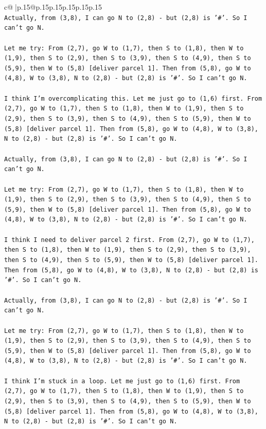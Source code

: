 \documentclass{article}
\begin{document}
{\begin{supertabular}{c@{$\;$}|p{.15\linewidth}@{}p{.15\linewidth}p{.15\linewidth}p{.15\linewidth}p{.15\linewidth}p{.15\linewidth}}
{{{\\ 
\texttt{Actually, from (3,8), I can go N to (2,8) {-} but (2,8) is '\#'. So I can't go N.} \\
\\ 
\texttt{Let me try: From (2,7), go W to (1,7), then S to (1,8), then W to (1,9), then S to (2,9), then S to (3,9), then S to (4,9), then S to (5,9), then W to (5,8) {[}deliver parcel 1{]}. Then from (5,8), go W to (4,8), W to (3,8), N to (2,8) {-} but (2,8) is '\#'. So I can't go N.} \\
\\ 
\texttt{I think I'm overcomplicating this. Let me just go to (1,6) first. From (2,7), go W to (1,7), then S to (1,8), then W to (1,9), then S to (2,9), then S to (3,9), then S to (4,9), then S to (5,9), then W to (5,8) {[}deliver parcel 1{]}. Then from (5,8), go W to (4,8), W to (3,8), N to (2,8) {-} but (2,8) is '\#'. So I can't go N.} \\
\\ 
\texttt{Actually, from (3,8), I can go N to (2,8) {-} but (2,8) is '\#'. So I can't go N.} \\
\\ 
\texttt{Let me try: From (2,7), go W to (1,7), then S to (1,8), then W to (1,9), then S to (2,9), then S to (3,9), then S to (4,9), then S to (5,9), then W to (5,8) {[}deliver parcel 1{]}. Then from (5,8), go W to (4,8), W to (3,8), N to (2,8) {-} but (2,8) is '\#'. So I can't go N.} \\
\\ 
\texttt{I think I need to deliver parcel 2 first. From (2,7), go W to (1,7), then S to (1,8), then W to (1,9), then S to (2,9), then S to (3,9), then S to (4,9), then S to (5,9), then W to (5,8) {[}deliver parcel 1{]}. Then from (5,8), go W to (4,8), W to (3,8), N to (2,8) {-} but (2,8) is '\#'. So I can't go N.} \\
\\ 
\texttt{Actually, from (3,8), I can go N to (2,8) {-} but (2,8) is '\#'. So I can't go N.} \\
\\ 
\texttt{Let me try: From (2,7), go W to (1,7), then S to (1,8), then W to (1,9), then S to (2,9), then S to (3,9), then S to (4,9), then S to (5,9), then W to (5,8) {[}deliver parcel 1{]}. Then from (5,8), go W to (4,8), W to (3,8), N to (2,8) {-} but (2,8) is '\#'. So I can't go N.} \\
\\ 
\texttt{I think I'm stuck in a loop. Let me just go to (1,6) first. From (2,7), go W to (1,7), then S to (1,8), then W to (1,9), then S to (2,9), then S to (3,9), then S to (4,9), then S to (5,9), then W to (5,8) {[}deliver parcel 1{]}. Then from (5,8), go W to (4,8), W to (3,8), N to (2,8) {-} but (2,8) is '\#'. So I can't go N.} \\
}}}
\end{supertabular}}
\end{document}
